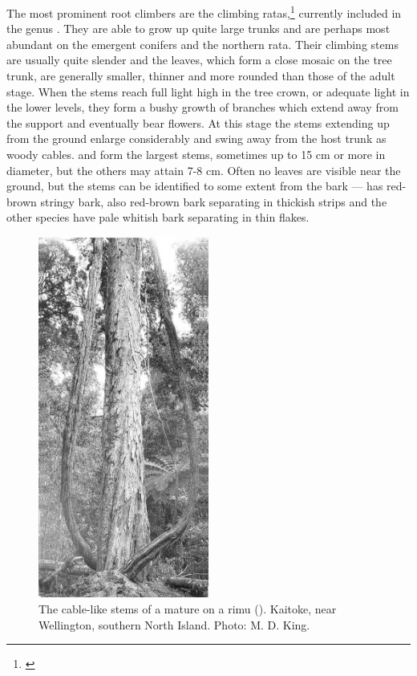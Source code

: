 The most prominent root climbers are the climbing ratas,\footnote{\cite{dawson1967growth}} currently included in the genus .
They are able to grow up quite large trunks and are perhaps most abundant on the emergent conifers and the northern rata.
Their climbing stems are usually quite slender and the leaves, which form a close mosaic on the tree trunk, are generally smaller, thinner and more rounded than those of the adult stage.
When the stems reach full light high in the tree crown, or adequate light in the lower levels, they form a bushy growth of branches which extend away from the support and eventually bear flowers.
At this stage the stems extending up from the ground enlarge considerably and swing away from the host trunk as woody cables.  and  form the largest stems, sometimes up to 15 cm or more in diameter, but the others may attain 7-8 cm.
Often no leaves are visible near the ground, but the stems can be identified to some extent from the bark —  has red-brown stringy bark,  also red-brown bark separating in thickish strips and the other species have pale whitish bark separating in thin flakes.

\begin{figure}
	\includegraphics[width=0.5\textwidth]{graphics/figure31perforata.jpg}
	\centering
	\caption[A mature \emph{Metrosideros perforata} on a rimu]{The cable-like stems of a mature  on a rimu (). Kaitoke, near Wellington, southern North Island. Photo: M. D. King.}
	\label{fig:31perforata}
\end{figure}

